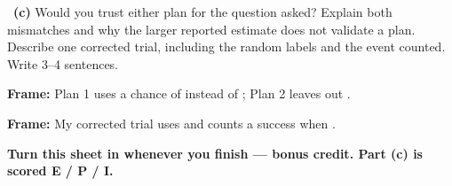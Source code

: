 \documentclass[11pt]{article}
\begin{document}
~\textbf{(c)} Would you trust either plan for the question asked? Explain both mismatches and why the larger reported estimate does not validate a plan. Describe one corrected trial, including the random labels and the event counted. Write 3--4 sentences.\par
\workspace{2.0in}

\begin{sentenceframebox}\raggedright\textbf{Frame:} Plan 1 uses a chance of \blank[0.6in] instead of \blank[0.6in]; Plan 2 leaves out \blank[1.4in].\end{sentenceframebox}

\begin{sentenceframebox}\raggedright\textbf{Frame:} My corrected trial uses \blank[1.9in] and counts a success when \blank[2.0in].\end{sentenceframebox}

\textbf{Turn this sheet in whenever you finish --- bonus credit. Part (c) is scored E / P / I.}\par
\end{document}
